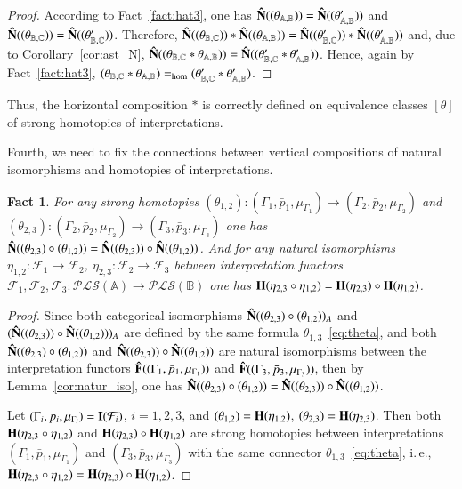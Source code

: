 \documentclass[12pt]{article}
\newtheorem{fact}{Fact}
\theoremstyle{definition}
\def\MA{{\mathbb{A}}}
\def\MB{{\mathbb{B}}}
\def\MC{{\mathbb{C}}}
\def\F{{\mathcal{F}}}
\def\PLS{{\mathcal{PLS}}}
\begin{document}
\begin{proof}
According to Fact~\ref{fact:hat3}, one has ${\bf \hat N}((\theta_{\MA,\MB}))={\bf \hat N}((\theta^\prime_{\MA,\MB}))$ and ${\bf \hat N}((\theta_{\MB,\MC}))= {\bf \hat N}((\theta^\prime_{\MB,\MC}))$. Therefore,  ${\bf \hat N}((\theta_{\MB,\MC}))\ast{\bf \hat N}((\theta_{\MA,\MB}))={\bf \hat N}((\theta^\prime_{\MB,\MC}))\ast{\bf \hat N}((\theta^\prime_{\MA,\MB}))$ and, due to Corollary~\ref{cor:ast_N}, ${\bf \hat N}((\theta_{\MB,\MC}\ast\theta_{\MA,\MB}))={\bf \hat N}((\theta^\prime_{\MB,\MC}\ast\theta^\prime_{\MA,\MB}))$. Hence, again by Fact~\ref{fact:hat3}, $(\theta_{\MB,\MC}\ast\theta_{\MA,\MB})=_{\rm hom}(\theta^\prime_{\MB,\MC}\ast\theta^\prime_{\MA,\MB})$.
\end{proof}

Thus, the horizontal composition $\ast$ is correctly defined on equivalence classes $[\theta]$ of strong homotopies of interpretations.

Fourth, we need to fix the connections between vertical compositions of natural isomorphisms and homotopies of interpretations. 

\begin{fact}\label{fact:hat5}
For any strong homotopies $(\theta_{1,2})\colon (\Gamma_1,\bar p_1,\mu_{\Gamma_1})\to (\Gamma_2,\bar p_2,\mu_{\Gamma_2})$ and $(\theta_{2,3})\colon (\Gamma_2,\bar p_2,\mu_{\Gamma_2})\to (\Gamma_3,\bar p_3,\mu_{\Gamma_3})$ one has ${\bf \hat N}((\theta_{2,3})\circ(\theta_{1,2}))={\bf \hat N}((\theta_{2,3}))\circ{\bf \hat N}((\theta_{1,2}))$. And for any natural isomorphisms $\eta_{1,2}\colon \F_1\to\F_2$, $\eta_{2,3}\colon \F_2\to\F_3$ between interpretation functors $\F_1,\F_2,\F_3\colon \PLS(\MA)\to \PLS(\MB)$ one has ${\bf H}(\eta_{2,3}\circ\eta_{1,2})={\bf  H}(\eta_{2,3})\circ{\bf  H}(\eta_{1,2})$.
\end{fact}

\begin{proof}
Since both categorical isomorphisms ${\bf \hat N}((\theta_{2,3})\circ(\theta_{1,2}))_A$ and $({\bf \hat N}((\theta_{2,3}))\circ{\bf \hat N}((\theta_{1,2})))_A$ are defined by the same formula $\theta_{1,3}$~\eqref{eq:theta}, and both ${\bf \hat N}((\theta_{2,3})\circ(\theta_{1,2}))$ and ${\bf \hat N}((\theta_{2,3}))\circ{\bf \hat N}((\theta_{1,2}))$ are natural isomorphisms between the interpretation functors ${\bf \hat F}((\Gamma_1,\bar p_1,\mu_{\Gamma_1}))$ and ${\bf \hat F}((\Gamma_3,\bar p_3,\mu_{\Gamma_3}))$, then by Lemma~\ref{cor:natur_iso}, one has ${\bf \hat N}((\theta_{2,3})\circ(\theta_{1,2}))={\bf \hat N}((\theta_{2,3}))\circ{\bf \hat N}((\theta_{1,2}))$. 

Let $(\Gamma_i,\bar p_i,\mu_{\Gamma_i})={\bf I}(\F_i)$, $i=1,2,3$, and $(\theta_{1,2})={\bf H}(\eta_{1,2})$, $(\theta_{2,3})={\bf H}(\eta_{2,3})$. Then both ${\bf H}(\eta_{2,3}\circ\eta_{1,2})$ and ${\bf  H}(\eta_{2,3})\circ{\bf  H}(\eta_{1,2})$ are strong homotopies between interpretations $(\Gamma_1,\bar p_1,\mu_{\Gamma_1})$ and $(\Gamma_3,\bar p_3,\mu_{\Gamma_3})$ with the same connector $\theta_{1,3}$~\eqref{eq:theta}, i.\,e., ${\bf H}(\eta_{2,3}\circ\eta_{1,2})={\bf  H}(\eta_{2,3})\circ{\bf  H}(\eta_{1,2})$.  
\end{proof}
\end{document}

